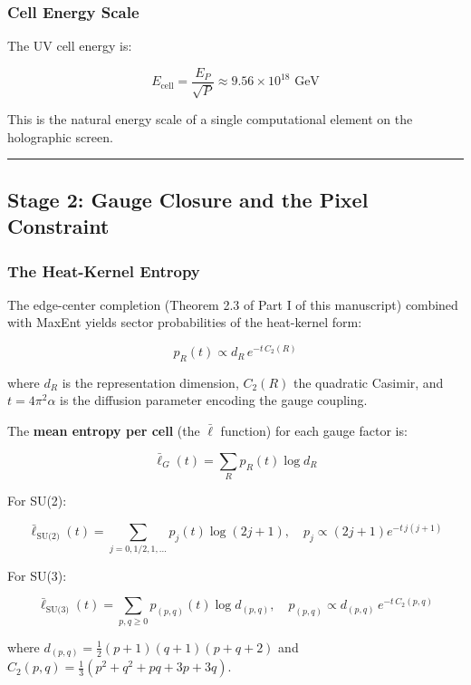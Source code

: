 \subsubsection{Cell Energy Scale}\label{22-cell-energy-scale}

The UV cell energy is:

\[E_{\text{cell}} = \frac{E_P}{\sqrt{P}} \approx 9.56 \times 10^{18} \text{ GeV}\]

This is the natural energy scale of a single computational element on the holographic screen.

\begin{center}\rule{0.5\linewidth}{0.5pt}\end{center}

\subsection{Stage 2: Gauge Closure and the Pixel Constraint}\label{3-stage-2-gauge-closure-and-the-pixel-constraint}

\subsubsection{The Heat-Kernel Entropy}\label{31-the-heat-kernel-entropy}

The edge-center completion (Theorem 2.3 of Part I of this manuscript) combined with MaxEnt yields sector probabilities of the heat-kernel form:

\[p_R(t) \propto d_R \, e^{-t \, C_2(R)}\]

where \(d_R\) is the representation dimension, \(C_2(R)\) the quadratic Casimir, and \(t = 4\pi^2 \alpha\) is the diffusion parameter encoding the gauge coupling.

The \textbf{mean entropy per cell} (the \(\bar{\ell}\) function) for each gauge factor is:

\[\bar{\ell}_G(t) = \sum_R p_R(t) \log d_R\]

For SU(2):

\[\bar{\ell}_{\text{SU(2)}}(t) = \sum_{j=0,1/2,1,...} p_j(t) \log(2j+1), \quad p_j \propto (2j+1) e^{-t \, j(j+1)}\]

For SU(3):

\[\bar{\ell}_{\text{SU(3)}}(t) = \sum_{p,q \geq 0} p_{(p,q)}(t) \log d_{(p,q)}, \quad p_{(p,q)} \propto d_{(p,q)} \, e^{-t \, C_2(p,q)}\]

where \(d_{(p,q)} = \frac{1}{2}(p+1)(q+1)(p+q+2)\) and \(C_2(p,q) = \frac{1}{3}(p^2 + q^2 + pq + 3p + 3q)\).

